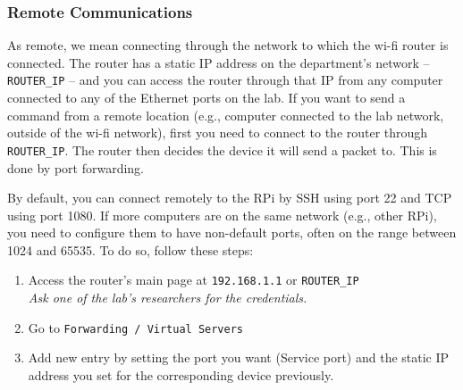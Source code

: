 \documentclass[twoside,a4paper]{refart}
\begin{document}
\subsubsection{Remote Communications}
As remote, we mean connecting through the network to which the wi-fi router is connected. The router has a static IP address on the department's network -- {\tt ROUTER\_IP} -- and you can access the router through that IP from any computer connected to any of the Ethernet ports on the lab.
If you want to send a command from a remote location (e.g., computer connected to the lab network, outside of the wi-fi network), first you need to connect to the router through {\tt ROUTER\_IP}. The router then decides the device it will send a packet to. This is done by port forwarding. 

By default, you can connect remotely to the RPi by SSH using port 22 and TCP using port 1080. If more computers are on the same network (e.g., other RPi), you need to configure them to have non-default ports,  often on the range between 1024 and 65535. To do so, follow these steps:
\begin{enumerate}
	\item
	Access the router's main page at {\tt 192.168.1.1} or {\tt ROUTER\_IP}  \\
	\emph{Ask one of the lab's researchers for the credentials.}
	\item
	Go to {\tt Forwarding / Virtual Servers}
	\item
	Add new entry by setting the port you want (Service port) and the static IP address you set for the corresponding device previously.
\end{enumerate}
\end{document}
